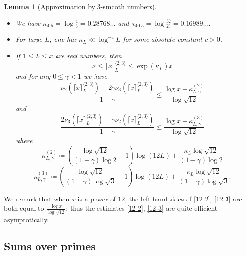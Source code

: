 \documentclass[12pt,a4paper,reqno]{amsart}
\numberwithin{equation}{section}
\theoremstyle{plain}
\newtheorem{lemma}[theorem]{Lemma}
\theoremstyle{definition}
\begin{document}
\begin{lemma}[Approximation by $3$-smooth numbers]\label{power-lemma}\ 
\begin{itemize}
\item[(i)]  We have $\kappa_{4.5} = \log\frac{4}{3} = 0.28768\dots$ and $\kappa_{40.5} = \log \frac{32}{27} = 0.16989\dots$.
\item[(ii)]  For large $L$, one has $\kappa_L \ll \log^{-c} L$ for some absolute constant $c>0$.
\item[(iii)]  If $1 \leq L \leq x$ are real numbers, then
\begin{equation}\label{mod-kappa}
  x \leq \lceil x \rceil^{\langle 2,3\rangle}_L \leq \exp(\kappa_L) x 
\end{equation}
and for any $0 \leq \gamma < 1$ we have
\begin{equation}\label{12-2}
\frac{\nu_2(\lceil x \rceil^{\langle 2,3\rangle}_L) - 2 \gamma \nu_3(\lceil x \rceil^{\langle 2,3\rangle}_L)}{1-\gamma} \leq \frac{\log x  + \kappa^{(2)}_{L,\gamma} }{\log \sqrt{12}} 
\end{equation}
and
\begin{equation}\label{12-3}
\frac{2\nu_3(\lceil x \rceil^{\langle 2,3\rangle}_L) - \gamma \nu_2(\lceil x \rceil^{\langle 2,3\rangle}_L)}{1-\gamma} \leq \frac{\log x + \kappa^{(3)}_{L,\gamma} }{\log \sqrt{12}} 
\end{equation}
where
\begin{equation}\label{kappastar-2-def}
\kappa^{(2)}_{L,\gamma} \coloneqq \left(\frac{\log \sqrt{12}}{(1-\gamma)\log 2} - 1\right) \log(12L) + \frac{\kappa_L\log \sqrt{12}}{(1-\gamma) \log 2}
\end{equation}
\begin{equation}\label{kappastar-3-def}
  \kappa^{(3)}_{L,\gamma} \coloneqq \left(\frac{\log \sqrt{12}}{(1-\gamma)\log \sqrt{3}} - 1\right) \log(12L) + \frac{\kappa_L\log \sqrt{12}}{(1-\gamma)\log \sqrt{3}}.
\end{equation}
\end{itemize}
\end{lemma}

We remark that when $x$ is a power of $12$, the left-hand sides of \eqref{12-2}, \eqref{12-3} are both equal to $\frac{\log x}{\log \sqrt{12}}$; thus the estimates \eqref{12-2}, \eqref{12-3} are quite efficient asymptotically.

\subsection{Sums over primes}
\end{document}
